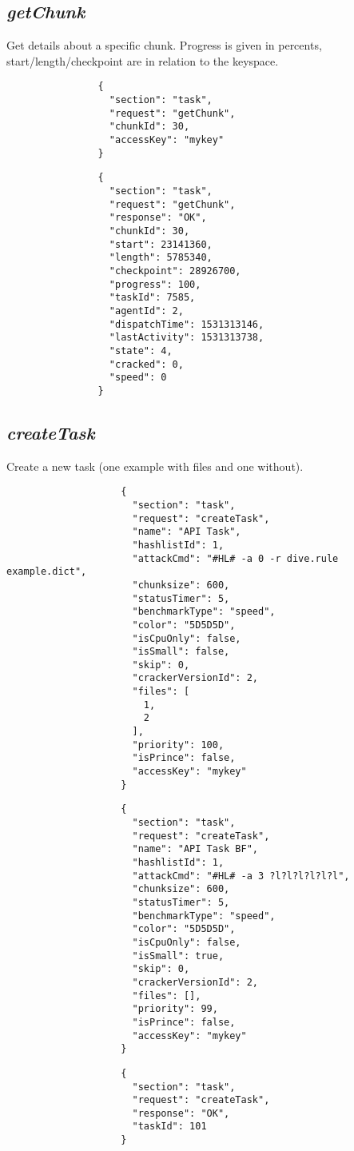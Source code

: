 		\subsection*{\textit{getChunk}}
			Get details about a specific chunk. Progress is given in percents, start/length/checkpoint are in relation to the keyspace.
			{
				\color{blue}
				\begin{verbatim}
				{
				  "section": "task",
				  "request": "getChunk",
				  "chunkId": 30,
				  "accessKey": "mykey"
				}
				\end{verbatim}
			}
			{
				\color{OliveGreen}
				\begin{verbatim}
				{
				  "section": "task",
				  "request": "getChunk",
				  "response": "OK",
				  "chunkId": 30,
				  "start": 23141360,
				  "length": 5785340,
				  "checkpoint": 28926700,
				  "progress": 100,
				  "taskId": 7585,
				  "agentId": 2,
				  "dispatchTime": 1531313146,
				  "lastActivity": 1531313738,
				  "state": 4,
				  "cracked": 0,
				  "speed": 0
				}
				\end{verbatim}
			}
			\subsection*{\textit{createTask}}
				Create a new task (one example with files and one without).
				{
					\color{blue}
					\begin{verbatim}
					{
					  "section": "task",
					  "request": "createTask",
					  "name": "API Task",
					  "hashlistId": 1,
					  "attackCmd": "#HL# -a 0 -r dive.rule example.dict",
					  "chunksize": 600,
					  "statusTimer": 5,
					  "benchmarkType": "speed",
					  "color": "5D5D5D",
					  "isCpuOnly": false,
					  "isSmall": false,
					  "skip": 0,
					  "crackerVersionId": 2,
					  "files": [
					    1,
					    2
					  ],
					  "priority": 100,
					  "isPrince": false,
					  "accessKey": "mykey"
					}
					\end{verbatim}
				}
				{
					\color{blue}
					\begin{verbatim}
					{
					  "section": "task",
					  "request": "createTask",
					  "name": "API Task BF",
					  "hashlistId": 1,
					  "attackCmd": "#HL# -a 3 ?l?l?l?l?l?l",
					  "chunksize": 600,
					  "statusTimer": 5,
					  "benchmarkType": "speed",
					  "color": "5D5D5D",
					  "isCpuOnly": false,
					  "isSmall": true,
					  "skip": 0,
					  "crackerVersionId": 2,
					  "files": [],
					  "priority": 99,
					  "isPrince": false,
					  "accessKey": "mykey"
					}
					\end{verbatim}
				}
				{
					\color{OliveGreen}
					\begin{verbatim}
					{
					  "section": "task",
					  "request": "createTask",
					  "response": "OK",
					  "taskId": 101
					}
					\end{verbatim}
				}
